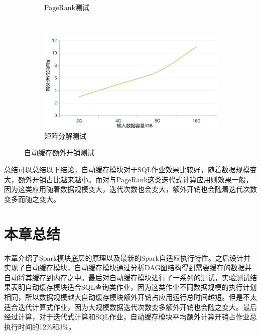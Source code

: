 \begin{figure}
\begin{subfigure}[b]{0.45\linewidth}
      \caption{PageRank测试}
      \label{fig:pagerank-ac-2}
    \end{subfigure}%
    ~%
    \begin{subfigure}[b]{0.45\linewidth}
      \includegraphics[width=\textwidth]{Img/mx2.jpg}
      \caption{矩阵分解测试}
      \label{fig:matrix-ac-2}
    \end{subfigure}
    \caption{自动缓存额外开销测试}
    \label{fig:autocache-2}
\end{figure}

总结可以总结以下结论，自动缓存模块对于SQL作业效果比较好，随着数据规模变大，额外开销占比越来越小。而对与PageRank这类迭代式计算应用则效果一般，因为这类应用随着数据规模变大，迭代次数也会变大，额外开销也会随着迭代次数变多而随之变大。

\section{本章总结}

本章介绍了Spark模块底层的原理以及最新的Spark自适应执行特性。之后设计并实现了自动缓存模块，自动缓存模块通过分析DAG图结构得到需要缓存的数据并自动将其缓存到内存之中。最后对自动缓存模块进行了一系列的测试，实验测试结果表明自动缓存模块适合SQL查询类作业，因为这类作业不同数据规模的执行计划相同，所以数据规模越大自动缓存模块额外开销占应用运行总时间越短。但是不太适合迭代计算式作业，因为大规模数据迭代次数变多额外开销也会随之变大。最后经过计算，对于迭代式计算和SQL作业，自动缓存模块平均额外计算开销占作业总执行时间的12\%和3\%。

